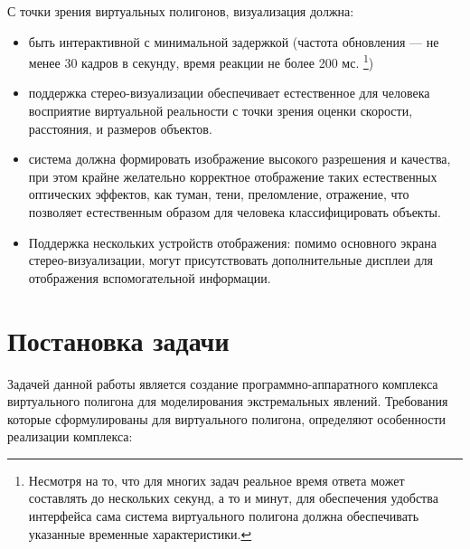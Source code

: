 С точки зрения виртуальных полигонов, визуализация должна:
\begin{itemize}
	\item	быть интерактивной с минимальной задержкой (частота обновления --- не менее 30 кадров в секунду, время реакции не более 200 мс. \footnote{Несмотря на то, что для многих задач реальное время ответа может составлять до нескольких секунд, а то и минут, для обеспечения удобства интерфейса сама система виртуального полигона должна обеспечивать указанные временные характеристики.})
	\item	поддержка стерео-визуализации обеспечивает естественное для человека восприятие 
			виртуальной реальности с точки зрения оценки скорости, расстояния, и размеров объектов.
	\item	система должна формировать изображение высокого разрешения и качества, 
			при этом крайне желательно корректное отображение таких естественных оптических эффектов,
			как туман, тени, преломление, отражение, что позволяет естественным образом для 
			человека классифицировать объекты.
	\item	Поддержка нескольких устройств отображения: помимо основного экрана стерео-визуализации, 
			могут присутствовать дополнительные дисплеи для отображения вспомогательной информации.
\end{itemize}



\section{Постановка задачи}
\label{ch1_1_5}
Задачей данной работы является создание программно-аппаратного комплекса виртуального полигона для моделирования экстремальных явлений.
Требования которые сформулированы для виртуального полигона, определяют особенности реализации комплекса:

